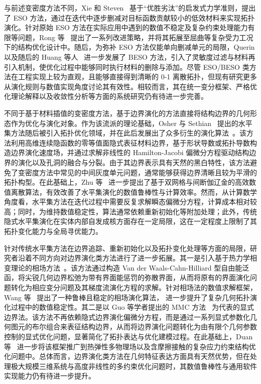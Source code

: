 与前述变密度方法不同，Xie 和 Steven~\cite{xieSimpleEvolutionaryProcedure1993} 基于“优胜劣汰”的启发式力学准则，提出了 ESO 方法，通过在迭代中逐步删减对目标函数贡献较小的低效材料来实现拓扑演化。针对原始 ESO 方法在实际应用中遇到的数值不稳定及复杂约束处理能力有限等问题，Rong 等~\cite{rongImprovedMethodEvolutionary2001} 提出了一系列改进策略，并将其拓展至屈曲等复杂受力工况下的结构优化设计中。随后，为弥补 ESO 方法仅能单向删减单元的局限，Querin 以及随后的 Huang 等人~\cite{querinEvolutionaryStructuralOptimisation1998, huangConvergentMeshindependentSolutions2007, huangEvolutionaryTopologyOptimization2010a} 进一步发展了 BESO 方法，引入了灵敏度过滤与材料再引入机制，使优化过程中能够同时执行材料的删除与添加。尽管 ESO/BESO 类方法在工程实现上较为直观，且能够直接得到清晰的 0-1 离散拓扑，但现有研究更多从演化规则与数值实现角度讨论其有效性。相较而言，其在统一变分框架、严格优化理论解释以及收敛性分析等方面的系统研究仍有待进一步完善。

不同于基于材料插值的变密度方法，基于边界演化的方法直接将结构边界的几何形态作为优化与演化对象。作为该流派的理论基础，Osher 与 Sethian~\cite{osherFrontsPropagatingCurvaturedependent1988, sethianStructuralBoundaryDesign2000} 提出的水平集方法随后被引入拓扑优化领域，并在此后发展出了众多衍生的演化算法~\cite{vandijkLevelsetMethodsStructural2013a}。该方法利用高维连续隐函数的零等值面隐式表征材料边界，基于形状导数或拓扑导数构造边界演化速度场，并通过求解非线性的 Hamilton-Jacobi 偏微分方程驱动结构边界的演化以及孔洞的融合与分裂。由于其边界表示具有天然的黑白特性，该方法避免了变密度方法中常见的中间灰度单元问题，通常能够获得边界清晰且较为平滑的拓扑构型。在此基础上，Zhu 等~\cite{liuTwogridBinaryLevel2023, tanDiscontinuousGalerkinLevel2023} 进一步提出了基于双网格与间断伽辽金的高效数值离散算法，有效改善了水平集演化的数值鲁棒性与计算效率。然而，从计算数学角度看，水平集方法在迭代过程中需要反复求解瞬态偏微分方程，计算成本相对较高；同时，为维持数值稳定性，算法通常依赖重新初始化等附加处理；此外，传统隐式水平集演化在实体内部自发成核方面存在一定局限，这在一定程度上限制了其拓扑变化能力与全局寻优能力。

针对传统水平集方法在边界追踪、重新初始化以及拓扑变化处理等方面的局限，研究者沿着不同方向对边界演化类方法进行了进一步拓展。其一是引入基于热力学相变理论的相场方法~\cite{wangPhaseFieldVariational2004, blankPhasefieldApproachesStructural2012a}。该方法通过构造 Van der Waals-Cahn-Hilliard 型自由能泛函，将尖锐几何边界松弛为带有界面能惩罚的弥散界面，从而将原有的界面演化问题转化为相应变分问题及其梯度流演化方程的求解。针对相场法的数值求解框架，Wang 等~\cite{chenRobustStablePhase2026} 提出了一种鲁棒且稳定的相场演化算法，
进一步提升了复杂几何拓扑演化过程中的数值稳定性。其二是以 Guo 等学者提出的 MMC 方法~\cite{guoDoingTopologyOptimization2014, guoExplicitStructuralTopology2016} 为代表的显式边界法。该方法不再依赖隐式边界演化偏微分方程，而是通过一系列显式参数化几何图元的布尔组合来表征结构边界，从而将边界演化问题转化为由有限个几何参数控制的显式优化问题，显著简化了拓扑表达与优化建模过程。在此基础上，Duan 等~\cite{yanThermoelasticStructuralTopology2021, hanStressbasedTopologyOptimization2022} 进一步将该框架推广到热弹性多物理场以及含摩擦接触的复杂应力约束结构优化问题中。总体而言，边界演化类方法在几何特征表达方面具有天然优势，但在处理极大规模三维系统与高度非线性的多约束优化问题时，其数值鲁棒性与通用软件实现能力仍有待进一步提升。


